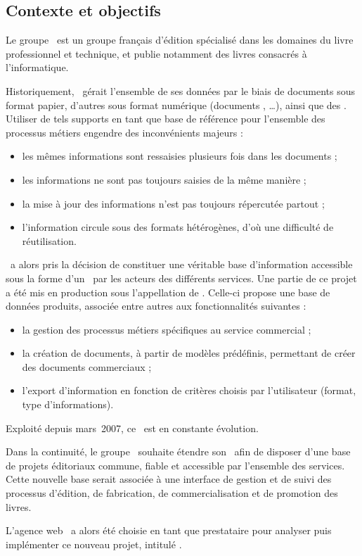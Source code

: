 \subsection{Contexte et objectifs}
\label{section:eyrolles_contexte}

Le groupe \aey\ est un groupe français d'édition spécialisé dans les domaines du livre professionnel et technique, et publie notamment des livres consacrés à l'informatique.

Historiquement, \aey\ gérait l'ensemble de ses données par le biais de documents sous format papier, d'autres sous format numérique (documents \amsword, \amsexcel\dots), ainsi que des \aemails. Utiliser de tels supports en tant que base de référence pour l'ensemble des processus métiers engendre des inconvénients majeurs :

\begin{itemize}
	\item les mêmes informations sont ressaisies plusieurs fois dans les documents ;
	\item les informations ne sont pas toujours saisies de la même manière ;
	\item la mise à jour des informations n'est pas toujours répercutée partout ;
	\item l'information circule sous des formats hétérogènes, d'où une difficulté de réutilisation.
\end{itemize}

\aey\ a alors pris la décision de constituer une véritable base d'information accessible sous la forme d'un \aintranet\ par les acteurs des différents services. Une partie de ce projet a été mis en production sous l'appellation de \emph{\alotun}. Celle-ci propose une base de données produits, associée entre autres aux fonctionnalités suivantes :

\begin{itemize}
	\item la gestion des processus métiers spécifiques au service commercial ;
	\item la création de documents, à partir de modèles prédéfinis, permettant de créer des documents commerciaux ;
	\item l'export d'information en fonction de critères choisis par l'utilisateur (format, type d'informations).
\end{itemize}

Exploité depuis mars~2007, ce \alotun\ est en constante évolution.

Dans la continuité, le groupe \aey\ souhaite étendre son \aintranet\ afin de disposer d'une base de projets éditoriaux commune, fiable et accessible par l'ensemble des services. Cette nouvelle base serait associée à une interface de gestion et de suivi des processus d'édition, de fabrication, de commercialisation et de
promotion des livres.

L'agence web \asl\ a alors été choisie en tant que prestataire pour analyser puis implémenter ce nouveau projet, intitulé \emph{\alotdeux}.
